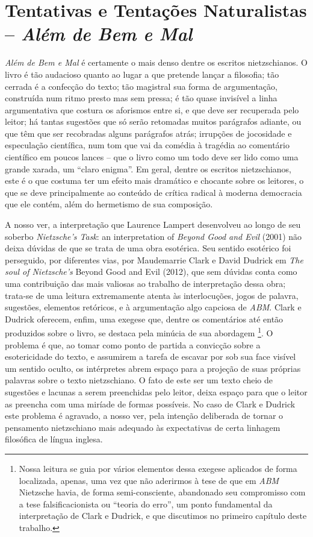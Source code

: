 \documentclass[
	12pt,				%
	openright,			%
	oneside,			%
	a4paper,			%
	english,			%
	french,				%
	spanish,			%
	brazil				%
	]{abntex2}
\begin{document}
\chapter{Tentativas e Tentações Naturalistas – \textit{Além de Bem e Mal}}
\label{cap3}

\textit{Além de Bem e Mal} é certamente o mais denso dentre os escritos nietzschianos. O livro é tão audacioso quanto ao lugar a que pretende lançar a filosofia; tão cerrada é a confecção do texto; tão magistral sua forma de argumentação, construída num ritmo presto mas sem pressa; é tão quase invisível a linha argumentativa que costura os aforismos entre si, e que deve ser recuperada pelo leitor; há tantas sugestões que só serão retomadas muitos parágrafos adiante, ou que têm que ser recobradas alguns parágrafos atrás; irrupções de jocosidade e especulação científica, num tom que vai da comédia à tragédia ao comentário científico em poucos lances – que o livro como um todo deve ser lido como uma grande xarada, um “claro enigma”. Em geral, dentre os escritos nietzschianos, este é o que costuma ter um efeito mais dramático e chocante sobre os leitores, o que se deve principalmente ao conteúdo de crítica radical à moderna democracia que ele contém, além do hermetismo de sua composição. 

	A nosso ver, a interpretação que Laurence Lampert desenvolveu ao longo de seu soberbo  \textit{Nietzsche's Task}: an interpretation of \textit{Beyond Good and Evil} (2001) não deixa dúvidas de que se trata de uma obra esotérica. Seu sentido esotérico foi perseguido, por diferentes vias, por Maudemarrie Clark e David Dudrick em \textit{The soul of Nietzsche's} Beyond Good and Evil (2012), que sem dúvidas conta como uma contribuição das mais valiosas ao trabalho de interpretação dessa obra; trata-se de uma leitura extremamente atenta às interlocuções, jogos de palavra, sugestões, elementos retóricos, e à argumentação algo capciosa de \textit{ABM}. Clark e Dudrick oferecem, enfim,  uma exegese que, dentre os comentários até então produzidos sobre o livro, se destaca pela minúcia de sua abordagem
\footnote{Nossa leitura se guia por vários elementos dessa exegese aplicados de forma localizada, apenas, uma vez que não aderirmos à tese de que em \textit{ABM} Nietzsche havia, de forma semi-consciente, abandonado seu compromisso com a tese falsificacionista ou “teoria do erro”, um ponto fundamental da interpretação de Clark e Dudrick, e que discutimos no primeiro capítulo deste trabalho.}. 
O problema é que, ao tomar como ponto de partida a convicção sobre a esotericidade do texto, e assumirem a tarefa de escavar por sob sua face visível um sentido oculto, os intérpretes abrem espaço para a projeção de suas próprias palavras sobre o texto nietzschiano. O fato de este ser um texto cheio de sugestões e lacunas a serem preenchidas pelo leitor, deixa espaço para que o leitor as preencha com uma miríade de formas possíveis. No caso de Clark e Dudrick este problema é agravado, a nosso ver, pela intenção deliberada de tornar o pensamento nietzschiano mais adequado às expectativas de certa linhagem filosófica de língua inglesa.
	
\end{document}
